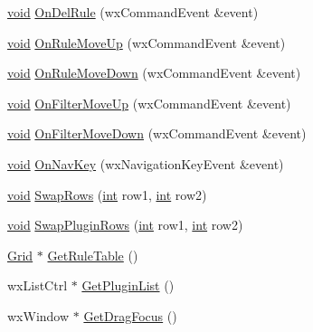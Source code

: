 \begin{DoxyCompactItemize}
\item 
\hyperlink{sound_8c_ae35f5844602719cf66324f4de2a658b3}{void} \hyperlink{class_ext_import_prefs_a5ac440717e435f7f5800b734d61697df}{On\+Del\+Rule} (wx\+Command\+Event \&event)
\item 
\hyperlink{sound_8c_ae35f5844602719cf66324f4de2a658b3}{void} \hyperlink{class_ext_import_prefs_a7873f854e5a62825f798a53745c9671b}{On\+Rule\+Move\+Up} (wx\+Command\+Event \&event)
\item 
\hyperlink{sound_8c_ae35f5844602719cf66324f4de2a658b3}{void} \hyperlink{class_ext_import_prefs_afcd9b1f7aa5eab1342e5582ebcb73245}{On\+Rule\+Move\+Down} (wx\+Command\+Event \&event)
\item 
\hyperlink{sound_8c_ae35f5844602719cf66324f4de2a658b3}{void} \hyperlink{class_ext_import_prefs_aeb4d57e02a69f5ef97b3f30e408e0ffd}{On\+Filter\+Move\+Up} (wx\+Command\+Event \&event)
\item 
\hyperlink{sound_8c_ae35f5844602719cf66324f4de2a658b3}{void} \hyperlink{class_ext_import_prefs_a4014250aabbc90f934f67cc459b95b08}{On\+Filter\+Move\+Down} (wx\+Command\+Event \&event)
\item 
\hyperlink{sound_8c_ae35f5844602719cf66324f4de2a658b3}{void} \hyperlink{class_ext_import_prefs_aa1d7d57720fe731f4a8c109fb9ce5c03}{On\+Nav\+Key} (wx\+Navigation\+Key\+Event \&event)
\item 
\hyperlink{sound_8c_ae35f5844602719cf66324f4de2a658b3}{void} \hyperlink{class_ext_import_prefs_ae43856bbc0ce9769f91bd8bdfb6d6851}{Swap\+Rows} (\hyperlink{xmltok_8h_a5a0d4a5641ce434f1d23533f2b2e6653}{int} row1, \hyperlink{xmltok_8h_a5a0d4a5641ce434f1d23533f2b2e6653}{int} row2)
\item 
\hyperlink{sound_8c_ae35f5844602719cf66324f4de2a658b3}{void} \hyperlink{class_ext_import_prefs_a5c8f06c56fe730a5dec6b05c45abfe08}{Swap\+Plugin\+Rows} (\hyperlink{xmltok_8h_a5a0d4a5641ce434f1d23533f2b2e6653}{int} row1, \hyperlink{xmltok_8h_a5a0d4a5641ce434f1d23533f2b2e6653}{int} row2)
\item 
\hyperlink{class_grid}{Grid} $\ast$ \hyperlink{class_ext_import_prefs_a3b595883680e7f5f6f946a3d9a96b638}{Get\+Rule\+Table} ()
\item 
wx\+List\+Ctrl $\ast$ \hyperlink{class_ext_import_prefs_a8b8e22105acb9249c586ea6f0f807b51}{Get\+Plugin\+List} ()
\item 
wx\+Window $\ast$ \hyperlink{class_ext_import_prefs_a993999fdd0d18c451d74f8d45e6173ae}{Get\+Drag\+Focus} ()
\end{DoxyCompactItemize}



